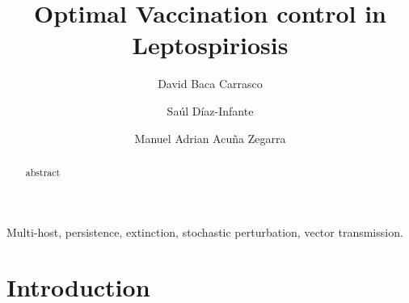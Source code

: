 \documentclass[3p,sort&compress]{elsarticle}
\DeclareRobustCommand{\1}[1]{\ensuremath \mathbbm{1}_{\{#1\}}}
\begin{document}
    \begin{frontmatter}
        \title{
            Optimal Vaccination control in Leptospiriosis
        }
        \author[add:unison]{%
            David Baca Carrasco
        }%
        \author[add:conacyt_unison]{%
            Sa\'ul D\'iaz-Infante
        }%
        \author[add:unison]%
        {Manuel Adrian Acu\~na Zegarra }
               \address[add:itson]{
         ITSON's address
        }

        \address[add:unison]{
            Departamento de Matem\'aticas, 
            Universidad de Sonora,
            83000, Hermosillo, Mexico
        }
        \address[add:conacyt_unison]{
            CONACYT-Univesrsidad de sonora
            Departamento de Matem\'aticas, 
            Divisi\'on de Posgrado
            Universidad de Sonora,
            83000, Hermosillo, Mexico
        }

        \begin{abstract}
            abstract
        \end{abstract}
        \begin{keyword}
            Multi-host, persistence, extinction, stochastic perturbation,
            vector transmission.
        \end{keyword}
    \end{frontmatter}
    \linenumbers
    \section{Introduction}
\end{document}
